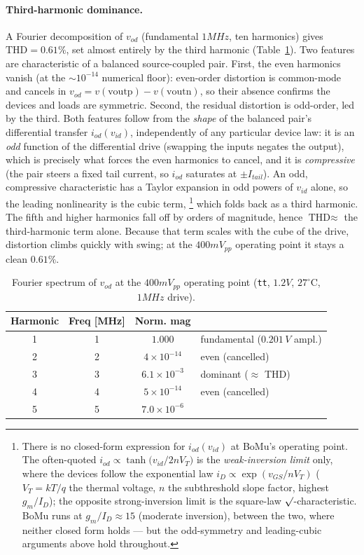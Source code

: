 \documentclass{article}
\begin{document}
\paragraph{Third-harmonic dominance.} A Fourier decomposition of $v_{od}$ (fundamental
$1MHz$, ten harmonics) gives $\text{THD}=0.61\%$, set almost entirely by the third
harmonic (Table~\ref{tab:thd}). Two features are characteristic of a balanced
source-coupled pair. First, the even harmonics vanish (at the $\sim10^{-14}$ numerical
floor): even-order distortion is common-mode and cancels in
$v_{od}=v(\text{voutp})-v(\text{voutn})$, so their absence confirms the devices and
loads are symmetric. Second, the residual distortion is odd-order, led by the third. Both features follow
from the \emph{shape} of the balanced pair's differential transfer
$i_{od}(v_{id})$, independently of any particular device law: it is an \emph{odd}
function of the differential drive (swapping the inputs negates the output), which is
precisely what forces the even harmonics to cancel, and it is \emph{compressive}
(the pair steers a fixed tail current, so $i_{od}$ saturates at $\pm I_{tail}$). An
odd, compressive characteristic has a Taylor expansion in odd powers of $v_{id}$
alone, so the leading nonlinearity is the cubic term,%
\footnote{There is no closed-form expression for $i_{od}(v_{id})$ at BoMu's
operating point. The often-quoted $i_{od}\propto\tanh\!\big(v_{id}/2nV_T\big)$ is the
\emph{weak-inversion limit} only, where the devices follow the exponential law
$i_D\propto\exp(v_{GS}/nV_T)$ ($V_T=kT/q$ the thermal voltage, $n$ the subthreshold
slope factor, highest $g_m/I_D$); the opposite strong-inversion limit is the
square-law $\surd$-characteristic. BoMu runs at $g_m/I_D\approx15$ (moderate
inversion), between the two, where neither closed form holds --- but the odd-symmetry
and leading-cubic arguments above hold throughout.} which folds back as a third
harmonic. The fifth and higher harmonics fall off by orders of
magnitude, hence $\text{THD}\approx$ the third-harmonic term alone. Because that term
scales with the cube of the drive, distortion climbs quickly with swing; at the
$400mV_{pp}$ operating point it stays a clean $0.61\%$.

\begin{table}[H]
    \centering
    \caption{Fourier spectrum of $v_{od}$ at the $400mV_{pp}$ operating point
             (\texttt{tt}, $1.2V$, $27^\circ$C, $1MHz$ drive).}
    \label{tab:thd}
    \begin{tabular}{c|c|c|l} \hline
        Harmonic & Freq [MHz] & Norm. mag & \\ \hline
        1 & 1 & $1.000$ & fundamental ($0.201\,V$ ampl.) \\ \hline
        2 & 2 & $4\times10^{-14}$ & even (cancelled) \\ \hline
        3 & 3 & $6.1\times10^{-3}$ & dominant ($\approx$ THD) \\ \hline
        4 & 4 & $5\times10^{-14}$ & even (cancelled) \\ \hline
        5 & 5 & $7.0\times10^{-6}$ & \\ \hline
    \end{tabular}
\end{table}
\end{document}
